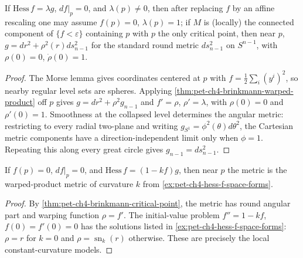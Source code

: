 \begin{theorem}
  \label{thm:pet-ch4-brinkmann-critical-point}

  If $\mathrm{Hess}\,f=\lambda g$, $df|_p=0$, and $\lambda(p)\ne0$, then after
  replacing $f$ by an affine rescaling one may assume $f(p)=0$, $\lambda(p)=1$;
  if $M$ is (locally) the connected component of $\{f<\varepsilon\}$ containing
  $p$ with $p$ the only critical point, then near $p$,
  $g=dr^2+\rho^2(r)ds_{n-1}^2$ for the standard round metric $ds_{n-1}^2$ on
  $S^{n-1}$, with $\rho(0)=0$, $\dot\rho(0)=1$.
\end{theorem}
\begin{proof}
  \sketch
  The Morse lemma gives coordinates centered at $p$ with
  $f=\tfrac12\sum_i(y^i)^2$, so nearby regular level sets are spheres. Applying
  \cref{thm:pet-ch4-brinkmann-warped-product} off $p$ gives
  $g=dr^2+\rho^2g_{n-1}$ and
  $f'=\rho$, $\rho'=\lambda$, with
  $\rho(0)=0$ and $\rho'(0)=1$. Smoothness at the collapsed level determines
  the angular metric: restricting to every radial two-plane and writing
  $g_{S^1}=\phi^2(\theta)d\theta^2$, the Cartesian metric components have a
  direction-independent limit only when $\phi=1$. Repeating this along every
  great circle gives $g_{n-1}=ds_{n-1}^2$.
\end{proof}


\begin{corollary}
  \label{cor:pet-ch4-brinkmann-constant-curvature}

  If $f(p)=0$, $df|_p=0$, and $\mathrm{Hess}\,f=(1-kf)g$, then near $p$ the metric
  is the warped-product metric of curvature $k$ from
  \cref{ex:pet-ch4-hess-f-space-forms}.
\end{corollary}
\begin{proof}
  \sketch
  By \cref{thm:pet-ch4-brinkmann-critical-point}, the metric has round angular
  part and warping function $\rho=f'$. The initial-value problem
  $f''=1-kf$, $f(0)=f'(0)=0$ has the solutions listed in
  \cref{ex:pet-ch4-hess-f-space-forms}: $\rho=r$ for $k=0$ and
  $\rho=\operatorname{sn}_k(r)$ otherwise. These are precisely the local
  constant-curvature models.
\end{proof}

